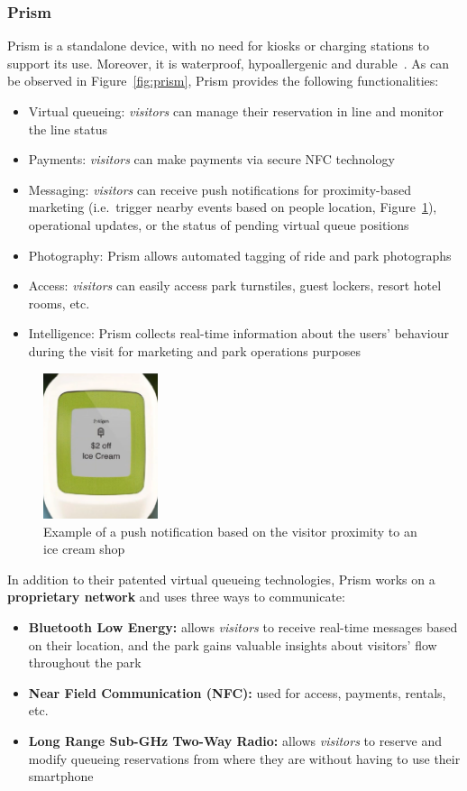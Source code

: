 \subsubsection*{Prism}
Prism is a standalone device, with no need for kiosks or charging stations to support its use.
Moreover, it is waterproof, hypoallergenic and durable~\cite{prism-desc}.
As can be observed in Figure~\ref{fig:prism}, Prism provides the following functionalities:
\begin{itemize}
    \item Virtual queueing: \textit{visitors} can manage their reservation in line and monitor the line status
    \item Payments: \textit{visitors} can make payments via secure NFC technology
    \item Messaging: \textit{visitors} can receive push notifications for proximity-based marketing (i.e.\ trigger nearby events based on people location, Figure~\ref{fig:prism-icecream}), operational updates, or the status of pending virtual queue positions
    \item Photography: Prism allows automated tagging of ride and park photographs
    \item Access: \textit{visitors} can easily access park turnstiles, guest lockers, resort hotel rooms, etc.
    \item Intelligence: Prism collects real-time information about the users' behaviour during the visit for marketing and park operations purposes
\end{itemize}

\begin{figure}[H]
    \centering
    \includegraphics[width=0.3\textwidth]{img/prism-icecream}
    \caption{Example of a push notification based on the visitor proximity to an ice cream shop}
    \label{fig:prism-icecream}
\end{figure}

In addition to their patented virtual queueing technologies, Prism works on a \textbf{proprietary network} and uses three ways to communicate:
\begin{itemize}
    \item \textbf{Bluetooth Low Energy:} allows \textit{visitors} to receive real-time messages based on their location, and the park gains valuable insights about visitors' flow throughout the park
    \item \textbf{Near Field Communication (NFC):} used for access, payments, rentals, etc.
    \item \textbf{Long Range Sub-GHz Two-Way Radio:} allows \textit{visitors} to reserve and modify queueing reservations from where they are without having to use their smartphone
\end{itemize}

